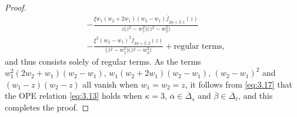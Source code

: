\documentclass[pdftex]{sigma}
\numberwithin{equation}{section}
\begin{document}
\begin{proof}
\begin{align}
&-\frac{\xi w_1(w_2+2w_1)(w_2-w_1)\overline{f}_{ 2\overline{\alpha}+\overline{\beta},1}(z)}{z\bigl(z^2-w_1^2\bigr)\bigl(z^2-w_2^2\bigr)}\nonumber\\
&-\frac{\xi^2(w_2-w_1)^2\overline{f}_{ 2\overline{\alpha}+\overline{\beta},2}(z)}{\bigl(z^2-w_1^2\bigr)\bigl(z^2-w_2^2\bigr)}+\text{regular terms},\label{eq:3.17}
\end{align}
and thus  consists solely of regular terms. As the terms $w_1^2(2w_2+w_1)(w_2-w_1)$, $w_1(w_2+2w_1)(w_2-w_1)$, $(w_2-w_1)^2$ and $(w_1-z)(w_2-z)$ all vanish when $w_1=w_2=z$, it follows from \eqref{eq:3.17} that the OPE relation \eqref{eq:3.13} holds when $\kappa=3$, $\overline{\alpha}\in\overline{\Delta}_s$ and $\overline{\beta}\in\overline{\Delta}_{\ell}$, and this completes the proof.
\end{proof}
\end{document}
